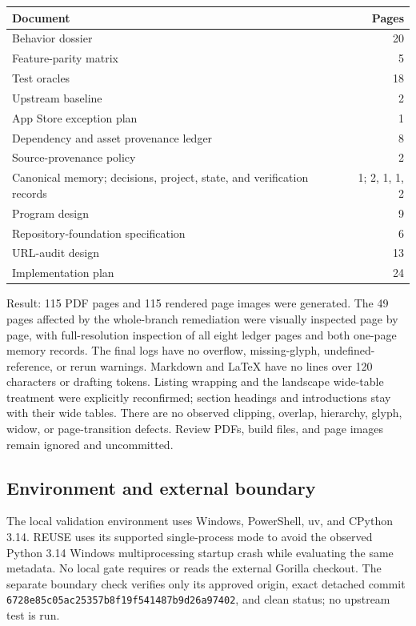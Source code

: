 \documentclass[
  letterpaper,
]{article}
\newcounter{none} %
\begin{document}
{\def\LTcaptype{none} %
\begin{longtable}[]{@{}lr@{}}
\toprule\noalign{}
Document & Pages \\
\midrule\noalign{}
\endhead
\bottomrule\noalign{}
\endlastfoot
Behavior dossier & 20 \\
Feature-parity matrix & 5 \\
Test oracles & 18 \\
Upstream baseline & 2 \\
App Store exception plan & 1 \\
Dependency and asset provenance ledger & 8 \\
Source-provenance policy & 2 \\
Canonical memory; decisions, project, state, and verification records & 1; 2, 1, 1, 2 \\
Program design & 9 \\
Repository-foundation specification & 6 \\
URL-audit design & 13 \\
Implementation plan & 24 \\
\end{longtable}
}

Result: 115 PDF pages and 115 rendered page images were generated. The 49 pages affected by the whole-branch remediation
were visually inspected page by page, with full-resolution inspection of all eight ledger pages and both one-page memory
records. The final logs have no overflow, missing-glyph, undefined-reference, or rerun warnings. Markdown and LaTeX have
no lines over 120 characters or drafting tokens. Listing wrapping and the landscape wide-table treatment were explicitly
reconfirmed; section headings and introductions stay with their wide tables. There are no observed clipping, overlap,
hierarchy, glyph, widow, or page-transition defects. Review PDFs, build files, and page images remain ignored and
uncommitted.

\subsection{Environment and external boundary}\label{environment-and-external-boundary}

The local validation environment uses Windows, PowerShell, uv, and CPython 3.14. REUSE uses its supported single-process
mode to avoid the observed Python 3.14 Windows multiprocessing startup crash while evaluating the same metadata. No
local gate requires or reads the external Gorilla checkout. The separate boundary check verifies only its approved
origin, exact detached commit \nolinkurl{6728e85c05ac25357b8f19f541487b9d26a97402}, and clean status; no upstream test
is run.
\end{document}

